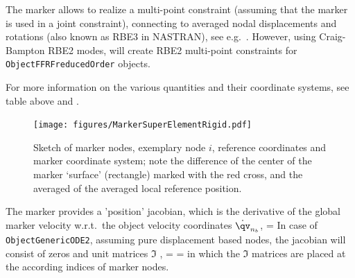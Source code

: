 %    
    \finishTable
%
    \vspace{6pt}
    The marker allows to realize a multi-point constraint (assuming that the marker is used in a joint constraint), 
    connecting to averaged nodal displacements and rotations (also known as RBE3 in NASTRAN), see e.g.\ \cite{HeirmanDesmet2010}. 
    However, using Craig-Bampton RBE2 modes, will create RBE2 multi-point constraints for \texttt{ObjectFFRFreducedOrder} objects.

    For more information on the various quantities and their coordinate systems, see table above and .
    \begin{figure}[tbph]
      \begin{center}
      \texttt{[image: figures/MarkerSuperElementRigid.pdf]}
      \end{center}
      \caption{Sketch of marker nodes, exemplary node $i$, reference coordinates and marker coordinate system; 
               note the difference of the center of the marker `surface' (rectangle) marked with the red cross, 
               and the averaged of the averaged local reference position.}
    	\label{fig:MarkerSuperElementRigid:sketch}
    \end{figure}
    The marker provides a 'position' jacobian, which is the derivative of the global marker velocity w.r.t.\ the 
    object velocity coordinates $\dot \qv_{n_b}$,
    \be
       =  \eqDot
    \ee
    In case of \texttt{ObjectGenericODE2}, assuming pure displacement based nodes,
    the jacobian will consist of zeros and unit matrices $\Im$ ,
    \be
       =  
      = \eqComma
    \ee
    in which the $\Im$ matrices are placed at the according indices of marker nodes.


